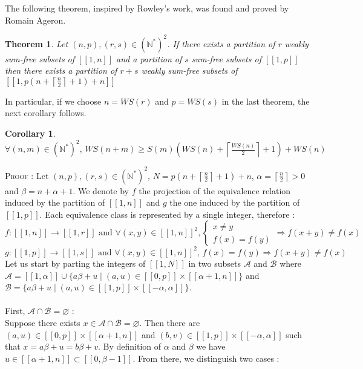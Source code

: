 \documentclass{article}
\newtheorem{theorem}{Theorem}[section]
\newtheorem{computational theorem}{Computational Theorem}[theorem]
\newtheorem{corollary}{Corollary}[theorem]
\begin{document}
The following theorem, inspired by Rowley's work, was found and proved by Romain Ageron.
\begin{theorem}
Let $(n,p), (r,s) \in (\mathbb{N}^*)^2$. If there exists a partition of $r$ weakly sum-free subsets of $[\![1,n]\!]$ and a partition of $s$ sum-free 
subsets of $[\![1,p]\!]$ then there exists a partition of $r+s$ weakly sum-free subsets of $[\![1,p(n+\left \lceil \frac{n}{2} \right \rceil + 1)+n]\!]$
\end{theorem}
In particular, if we choose $n = WS(r)$ and $p = WS(s)$ in the last theorem, the next corollary follows.
\begin{corollary}
$ \forall (n,m) \in (\mathbb{N}^*)^2 \text{, } WS(n+m) \geqslant S(m) \left (WS(n) + \left \lceil \frac{WS(n)}{2} \right \rceil +1 \right) + WS(n)$
\end{corollary}
\textsc{Proof :} Let $(n,p), (r,s) \in (\mathbb{N}^*)^2$,  $N = p(n+\left \lceil \frac{n}{2} \right \rceil + 1)+n$, $\alpha = \left \lceil \frac{n}{2} \right \rceil > 0$ and $\beta = n + \alpha + 1$. We denote by $f$ the projection of the equivalence relation induced by the partition of $[\![1,n]\!]$ and $g$ the one induced by the partition of $[\![1,p]\!]$. Each equivalence class is represented by a single integer, therefore :
\[ f : [\![1,n]\!] \longrightarrow [\![1,r]\!] \text{ and } \forall (x,y) \in [\![1,n]\!]^2, \left\{
    \begin{array}{ll}
        x \neq y \\
        f(x) = f(y)
    \end{array}
\right.
\Longrightarrow f(x+y) \neq f(x)
\]
\[g : [\![1,p]\!] \longrightarrow [\![1,s]\!] \text{ and } \forall (x,y) \in [\![1,n]\!]^2 \text{, } f(x) = f(y) \Longrightarrow f(x+y) \neq f(x)
\]
Let us start by parting the integers of $[\![1,N]\!]$ in two subsets $\mathcal{A}$ and $\mathcal{B}$ where $\mathcal{A} = [\![1,\alpha]\!] \cup \{a\beta + u \mid (a,u) \in [\![0,p]\!] \times [\![\alpha + 1,n]\!]\}$ and $\mathcal{B} = \{a\beta + u \mid (a,u) \in [\![1,p]\!] \times [\![-\alpha,\alpha]\!]\}$.\\
\\
First, \underline{$\mathcal{A} \cap \mathcal{B} = \varnothing$} : \\
Suppose there exists $x \in \mathcal{A} \cap \mathcal{B} = \varnothing$. Then there are $(a,u) \in [\![0,p]\!] \times [\![\alpha + 1,n]\!]$ and $(b,v) \in [\![1,p]\!] \times [\![-\alpha,\alpha]\!]$ such that $x = a\beta + u = b\beta +v$. By definition of $\alpha$ and  $\beta$ we have $u \in [\![\alpha + 1,n]\!] \subset [\![0,\beta - 1]\!]$. From there, we distinguish two cases :
\end{document}
